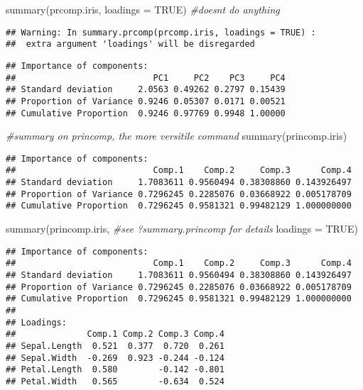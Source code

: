 \documentclass[
]{book}
\newenvironment{Shaded}{\begin{snugshade}}{\end{snugshade}}
\newcommand{\AttributeTok}[1]{\textcolor[rgb]{0.77,0.63,0.00}{#1}}
\newcommand{\CommentTok}[1]{\textcolor[rgb]{0.56,0.35,0.01}{\textit{#1}}}
\newcommand{\ConstantTok}[1]{\textcolor[rgb]{0.00,0.00,0.00}{#1}}
\newcommand{\FunctionTok}[1]{\textcolor[rgb]{0.00,0.00,0.00}{#1}}
\newcommand{\NormalTok}[1]{#1}
\begin{document}
\begin{Shaded}
\begin{Highlighting}[]
\FunctionTok{summary}\NormalTok{(prcomp.iris, }\AttributeTok{loadings =} \ConstantTok{TRUE}\NormalTok{) }\CommentTok{\#doesn\textquotesingle{}t do anything}
\end{Highlighting}
\end{Shaded}

\begin{verbatim}
## Warning: In summary.prcomp(prcomp.iris, loadings = TRUE) :
##  extra argument 'loadings' will be disregarded
\end{verbatim}

\begin{verbatim}
## Importance of components:
##                           PC1     PC2    PC3     PC4
## Standard deviation     2.0563 0.49262 0.2797 0.15439
## Proportion of Variance 0.9246 0.05307 0.0171 0.00521
## Cumulative Proportion  0.9246 0.97769 0.9948 1.00000
\end{verbatim}

\begin{Shaded}
\begin{Highlighting}[]
\CommentTok{\#summary on princomp, the more versitile command}
\FunctionTok{summary}\NormalTok{(princomp.iris)}
\end{Highlighting}
\end{Shaded}

\begin{verbatim}
## Importance of components:
##                           Comp.1    Comp.2     Comp.3      Comp.4
## Standard deviation     1.7083611 0.9560494 0.38308860 0.143926497
## Proportion of Variance 0.7296245 0.2285076 0.03668922 0.005178709
## Cumulative Proportion  0.7296245 0.9581321 0.99482129 1.000000000
\end{verbatim}

\begin{Shaded}
\begin{Highlighting}[]
\FunctionTok{summary}\NormalTok{(princomp.iris,    }\CommentTok{\#see ?summary.princomp for details}
        \AttributeTok{loadings =} \ConstantTok{TRUE}\NormalTok{)}
\end{Highlighting}
\end{Shaded}

\begin{verbatim}
## Importance of components:
##                           Comp.1    Comp.2     Comp.3      Comp.4
## Standard deviation     1.7083611 0.9560494 0.38308860 0.143926497
## Proportion of Variance 0.7296245 0.2285076 0.03668922 0.005178709
## Cumulative Proportion  0.7296245 0.9581321 0.99482129 1.000000000
## 
## Loadings:
##              Comp.1 Comp.2 Comp.3 Comp.4
## Sepal.Length  0.521  0.377  0.720  0.261
## Sepal.Width  -0.269  0.923 -0.244 -0.124
## Petal.Length  0.580        -0.142 -0.801
## Petal.Width   0.565        -0.634  0.524
\end{verbatim}
\end{document}
